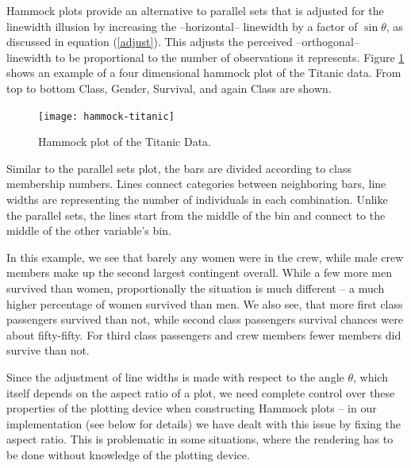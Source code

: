 Hammock plots \citep{schonlau:2003} provide an alternative to parallel sets that is adjusted for the linewidth illusion by increasing the --horizontal-- linewidth by  a factor of $\sin \theta$, as discussed in equation (\ref{adjust}). This adjusts the perceived --orthogonal-- linewidth to be proportional to the number of observations it represents. 
 Figure \ref{hammock} shows an example of a four dimensional hammock plot of the Titanic data. From top to bottom Class, Gender, Survival, and again Class are shown. 
\begin{figure}
\centering
\texttt{[image: hammock-titanic]}
\caption{\label{hammock} Hammock plot of the Titanic Data. }
\end{figure}

Similar to the parallel sets plot, the bars are divided according to class membership numbers.  Lines connect categories between neighboring bars, line widths are representing the number of individuals in each combination. Unlike the parallel sets, the lines start from the middle of the bin and connect to the middle of the other variable's bin. 

In this example, we see that barely any women were in the crew, while male crew members make up the second largest contingent overall. While a few more men survived than women, proportionally the situation is much different -- a much higher percentage of women survived than men. We also see, that more first class passengers survived than not, while second class passengers survival chances were about fifty-fifty. For third class passengers and crew members fewer members did  survive than not. 

Since the adjustment of line widths is made with respect to the angle $\theta$, which itself depends on the aspect ratio of a plot, we need complete control over these properties of the plotting device when constructing Hammock plots  -- in our implementation (see below for details) we have dealt with this issue by fixing the aspect ratio. This is problematic in some situations, where the rendering has to be done without knowledge of the plotting device. 

